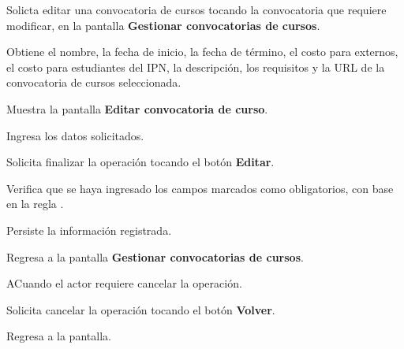 	\begin{UCtrayectoria}
		
		\UCpaso [\UCactor] Solicta editar una convocatoria de cursos tocando la convocatoria que requiere modificar, en la pantalla \textbf{Gestionar convocatorias de cursos}.
		
		\UCpaso Obtiene el nombre, la fecha de inicio, la fecha de término, el costo para externos, el costo para estudiantes del IPN, la descripción, los requisitos y la URL de la convocatoria de cursos seleccionada.
		
		\UCpaso Muestra la pantalla \textbf{Editar convocatoria de curso}.
		
		\UCpaso [\UCactor] Ingresa los datos solicitados.
		
		\UCpaso [\UCactor] Solicita finalizar la operación tocando el botón \textbf{Editar}. 
		
		\UCpaso Verifica que se haya ingresado los campos marcados como obligatorios, con base en la regla .
		
		\UCpaso Persiste la información registrada.
		
		\UCpaso Regresa a la pantalla \textbf{Gestionar convocatorias de cursos}.
		
	\end{UCtrayectoria}

	\begin{UCtrayectoriaA}{A}{Cuando el actor requiere cancelar la operación.}
		
		\UCpaso [\UCactor] Solicita cancelar la operación tocando el botón \textbf{Volver}.
		
		\UCpaso Regresa a la pantalla.
		
	\end{UCtrayectoriaA}
